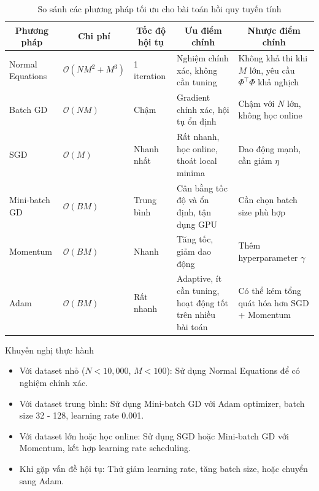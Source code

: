 \begin{table}[H]
    \centering
    \caption{So sánh các phương pháp tối ưu cho bài toán hồi quy tuyến tính}
    \label{tab:optimizer_comparison}
    \renewcommand{\arraystretch}{1.4}
    \footnotesize
    \begin{tabular}{|p{2.5cm}|p{2.5cm}|p{2.5cm}|p{3cm}|p{4cm}|}
        \hline
            \multicolumn{1}{|c|}{\textbf{Phương pháp}} &
            \multicolumn{1}{c|}{\textbf{Chi phí}} &
            \multicolumn{1}{c|}{\textbf{Tốc độ hội tụ}} &
            \multicolumn{1}{c|}{\textbf{Ưu điểm chính}} &
            \multicolumn{1}{c|}{\textbf{Nhược điểm chính}} \\
        \hline
        Normal Equations & $\mathcal{O}(NM^2 + M^3)$ & 1 iteration & Nghiệm chính xác, không cần tuning & Không khả thi khi $M$ lớn, yêu cầu $\Phi^{\top}\Phi$ khả nghịch \\
        \hline
        Batch GD & $\mathcal{O}(NM)$ & Chậm & Gradient chính xác, hội tụ ổn định & Chậm với $N$ lớn, không học online \\
        \hline
        SGD & $\mathcal{O}(M)$ & Nhanh nhất & Rất nhanh, học online, thoát local minima & Dao động mạnh, cần giảm $\eta$ \\
        \hline
        Mini-batch GD & $\mathcal{O}(BM)$ & Trung bình & Cân bằng tốc độ và ổn định, tận dụng GPU & Cần chọn batch size phù hợp \\
        \hline
        Momentum & $\mathcal{O}(BM)$ & Nhanh & Tăng tốc, giảm dao động & Thêm hyperparameter $\gamma$ \\
        \hline
        Adam & $\mathcal{O}(BM)$ & Rất nhanh & Adaptive, ít cần tuning, hoạt động tốt trên nhiều bài toán & Có thể kém tổng quát hóa hơn SGD + Momentum \\
        \hline
    \end{tabular}
\end{table}

\begin{notebox}{Khuyến nghị thực hành}
\begin{itemize}
    \item Với dataset nhỏ ($N < 10{,}000$, $M < 100$): Sử dụng Normal Equations để có nghiệm chính xác.
    \item Với dataset trung bình: Sử dụng Mini-batch GD với Adam optimizer, batch size 32 - 128, learning rate 0.001.
    \item Với dataset lớn hoặc học online: Sử dụng SGD hoặc Mini-batch GD với Momentum, kết hợp learning rate scheduling.
    \item Khi gặp vấn đề hội tụ: Thử giảm learning rate, tăng batch size, hoặc chuyển sang Adam.
\end{itemize}
\end{notebox}

